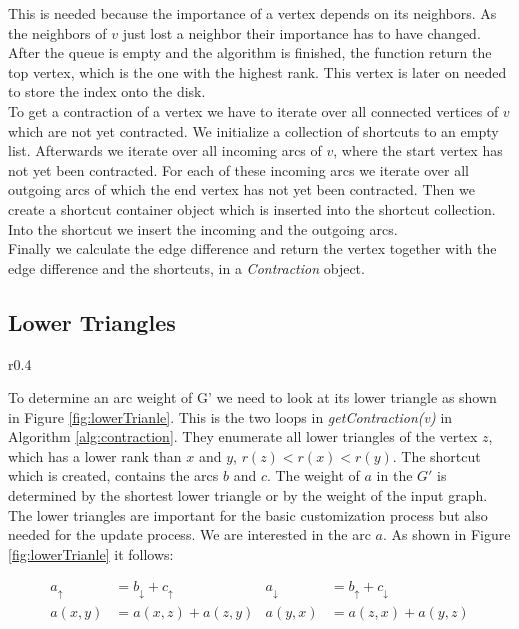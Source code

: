 This is needed because the importance of a vertex depends on its neighbors.
As the neighbors of $v$ just lost a neighbor their importance has to have changed.
After the queue is empty and the algorithm is finished, the function return the top vertex, which is the one with the highest rank.
This vertex is later on needed to store the index onto the disk.
\\
To get a contraction of a vertex we have to iterate over all connected vertices of $v$ which are not yet contracted.
We initialize  a collection of shortcuts to an empty list.
Afterwards we iterate over all incoming arcs of $v$, where the start vertex has not yet been contracted.
For each of these incoming arcs we iterate over all outgoing arcs of which the end vertex has not yet been contracted.
Then we create a shortcut container object which is inserted into the shortcut collection.
Into the shortcut we insert the incoming and the outgoing arcs.
\\
Finally we calculate the edge difference and return the vertex together with the edge difference and the shortcuts, in a \textit{Contraction} object.

\subsection{Lower Triangles} \label{sec:lower_triangles}

\begin{wrapfigure}{r}{0.4\textwidth}
    \centering
    
    \caption{Lower Triangle}
    \label{fig:lowerTrianle}
\end{wrapfigure}


To determine an arc weight of G' we need to look at its lower triangle as shown in Figure \ref{fig:lowerTrianle}.
This is the two loops in \textit{getContraction(v)} in Algorithm \ref{alg:contraction}.
They enumerate all lower triangles of the vertex $z$, which has a lower rank than $x$ and $y$, $r(z) < r(x) < r(y)$.
The shortcut which is created, contains the arcs $b$ and $c$.
The weight of $a$ in the $G'$ is determined by the shortest lower triangle or by the weight of the input graph.
\\
The lower triangles are important for the basic customization process but also needed for the update process.
We are interested in the arc $a$.
As shown in Figure \ref{fig:lowerTrianle} it follows:


\begin{align*}\label{eq:lower_triangle}
    a_\uparrow & = b_\downarrow + c_\uparrow    &  a_\downarrow & = b_\uparrow + c_\downarrow \\
    a(x, y) & = a(x, z) + a(z, y) & a(y, x) & = a(z, x) + a(y, z)
\end{align*}

